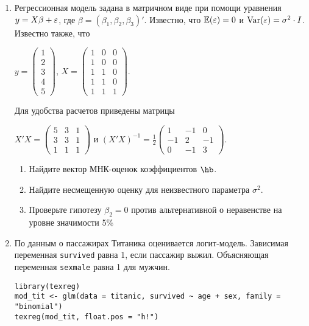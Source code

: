 \documentclass[12pt, a4paper]{article}
\theoremstyle{definition}
\begin{document}
\begin{enumerate}
\item Регрессионная модель  задана в матричном виде при помощи уравнения $y=X\beta+\varepsilon$, где $\beta=(\beta_1,\beta_2,\beta_3)'$.
Известно, что $\mathbb{E}(\varepsilon)=0$  и  $\operatorname{Var}(\varepsilon)=\sigma^2\cdot I$.
Известно также, что

$y=\left(
\begin{array}{c}
1\\
2\\
3\\
4\\
5
\end{array}\right)$,
$X=\left(\begin{array}{ccc}
1 & 0 & 0 \\
1 & 0 & 0 \\
1 & 1 & 0 \\
1 & 1 & 0 \\
1 & 1 & 1
\end{array}\right)$.


Для удобства расчетов приведены матрицы


$X'X=\left(
\begin{array}{ccc}
5 & 3 & 1\\
3 & 3 & 1\\
1 & 1 & 1
\end{array}\right)$ и $(X'X)^{-1}=\frac{1}{2}\left(
\begin{array}{ccc}
1 & -1 & 0 \\
-1 & 2 & -1 \\
0 & -1 & 3
\end{array}\right)$.

\begin{enumerate}
\item Найдите вектор МНК-оценок коэффициентов $\hb$.
\item Найдите несмещенную оценку для неизвестного параметра $\sigma^2$.
\item Проверьте гипотезу $\beta_2=0$ против альтернативной о неравенстве на уровне значимости 5\%

\end{enumerate}




\item По данным о пассажирах Титаника оценивается логит-модель. Зависимая переменная \verb|survived| равна 1, если пассажир выжил. Объясняющая переменная \verb|sexmale| равна 1 для  мужчин.

\begin{verbatim}
library(texreg)
mod_tit <- glm(data = titanic, survived ~ age + sex, family = "binomial")
texreg(mod_tit, float.pos = "h!")
\end{verbatim}



\end{enumerate}
\end{document}
